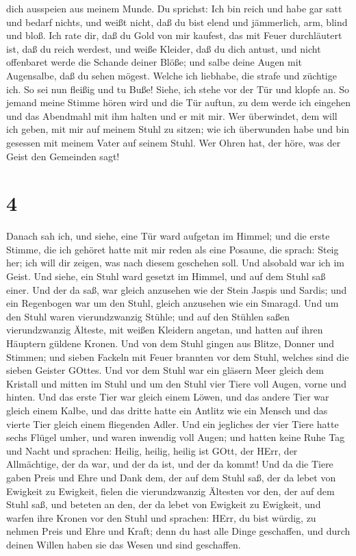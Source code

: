 dich ausspeien aus meinem Munde.  Du sprichst: Ich bin
reich und habe gar satt und bedarf nichts, und weißt nicht, daß du bist
elend und jämmerlich, arm, blind und bloß.  Ich rate dir,
daß du Gold von mir kaufest, das mit Feuer durchläutert ist, daß du
reich werdest, und weiße Kleider, daß du dich antust, und nicht
offenbaret werde die Schande deiner Blöße; und salbe deine Augen mit
Augensalbe, daß du sehen mögest.  Welche ich liebhabe, die
strafe und züchtige ich. So sei nun fleißig und tu Buße! 
Siehe, ich stehe vor der Tür und klopfe an. So jemand meine Stimme hören
wird und die Tür auftun, zu dem werde ich eingehen und das Abendmahl mit
ihm halten und er mit mir.  Wer überwindet, dem will ich
geben, mit mir auf meinem Stuhl zu sitzen; wie ich überwunden habe und
bin gesessen mit meinem Vater auf seinem Stuhl.  Wer Ohren
hat, der höre, was der Geist den Gemeinden sagt!

\hypertarget{section-2}{%
\section{4}\label{section-2}}

 Danach sah ich, und siehe, eine Tür ward aufgetan im
Himmel; und die erste Stimme, die ich gehöret hatte mit mir reden als
eine Posaune, die sprach: Steig her; ich will dir zeigen, was nach
diesem geschehen soll.  Und alsobald war ich im Geist. Und
siehe, ein Stuhl ward gesetzt im Himmel, und auf dem Stuhl saß einer.
 Und der da saß, war gleich anzusehen wie der Stein Jaspis
und Sardis; und ein Regenbogen war um den Stuhl, gleich anzusehen wie
ein Smaragd.  Und um den Stuhl waren vierundzwanzig Stühle;
und auf den Stühlen saßen vierundzwanzig Älteste, mit weißen Kleidern
angetan, und hatten auf ihren Häuptern güldene Kronen.  Und
von dem Stuhl gingen aus Blitze, Donner und Stimmen; und sieben Fackeln
mit Feuer brannten vor dem Stuhl, welches sind die sieben Geister
GOttes.  Und vor dem Stuhl war ein gläsern Meer gleich dem
Kristall und mitten im Stuhl und um den Stuhl vier Tiere voll Augen,
vorne und hinten.  Und das erste Tier war gleich einem
Löwen, und das andere Tier war gleich einem Kalbe, und das dritte hatte
ein Antlitz wie ein Mensch und das vierte Tier gleich einem fliegenden
Adler.  Und ein jegliches der vier Tiere hatte sechs Flügel
umher, und waren inwendig voll Augen; und hatten keine Ruhe Tag und
Nacht und sprachen: Heilig, heilig, heilig ist GOtt, der HErr, der
Allmächtige, der da war, und der da ist, und der da kommt! 
Und da die Tiere gaben Preis und Ehre und Dank dem, der auf dem Stuhl
saß, der da lebet von Ewigkeit zu Ewigkeit,  fielen die
vierundzwanzig Ältesten vor den, der auf dem Stuhl saß, und beteten an
den, der da lebet von Ewigkeit zu Ewigkeit, und warfen ihre Kronen vor
den Stuhl und sprachen:  HErr, du bist würdig, zu nehmen
Preis und Ehre und Kraft; denn du hast alle Dinge geschaffen, und durch
deinen Willen haben sie das Wesen und sind geschaffen.

